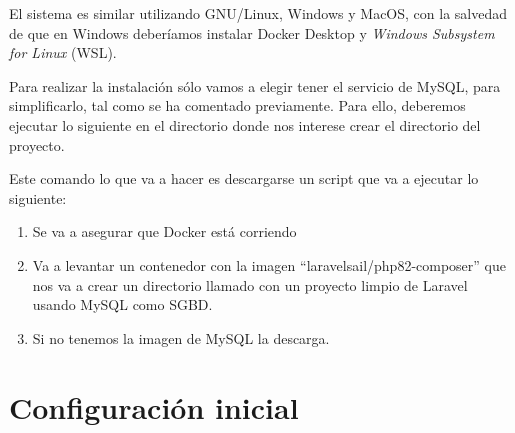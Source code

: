 
El sistema es similar utilizando GNU/Linux, Windows y MacOS, con la salvedad de que en Windows deberíamos instalar Docker Desktop y \textit{Windows Subsystem for Linux} (WSL).

Para realizar la instalación sólo vamos a elegir tener el servicio de MySQL, para simplificarlo, tal como se ha comentado previamente. Para ello, deberemos ejecutar lo siguiente en el directorio donde nos interese crear el directorio del proyecto.


Este comando lo que va a hacer es descargarse un script que va a ejecutar lo siguiente:
\begin{enumerate}
    \item Se va a asegurar que Docker está corriendo
    \item Va a levantar un contenedor con la imagen “laravelsail/php82-composer” que nos va a crear un directorio llamado  con un proyecto limpio de Laravel usando MySQL como SGBD.
    \item Si no tenemos la imagen de MySQL la descarga.
\end{enumerate}





\section{Configuración inicial}

